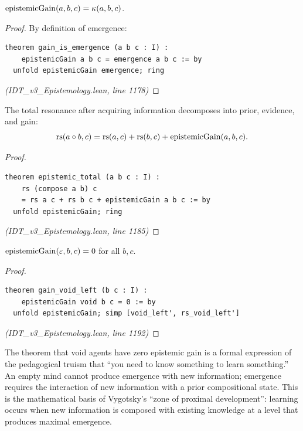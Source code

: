 \begin{theorem}
\label{thm:gain-is-emergence}
$\mathrm{epistemicGain}(a, b, c) = \kappa(a, b, c)$.
\end{theorem}

\begin{proof}
By definition of emergence:
\begin{lstlisting}
theorem gain_is_emergence (a b c : I) :
    epistemicGain a b c = emergence a b c := by
  unfold epistemicGain emergence; ring
\end{lstlisting}
\textit{(IDT\_v3\_Epistemology.lean, line 1178)}
\end{proof}

\begin{theorem}
\label{thm:epistemic-total}
The total resonance after acquiring information decomposes into prior, evidence,
and gain:
\[
  \mathrm{rs}(a \circ b, c) = \mathrm{rs}(a, c) + \mathrm{rs}(b, c) + \mathrm{epistemicGain}(a, b, c).
\]
\end{theorem}

\begin{proof}
\begin{lstlisting}
theorem epistemic_total (a b c : I) :
    rs (compose a b) c
    = rs a c + rs b c + epistemicGain a b c := by
  unfold epistemicGain; ring
\end{lstlisting}
\textit{(IDT\_v3\_Epistemology.lean, line 1185)}
\end{proof}

\begin{theorem}
\label{thm:gain-void}
$\mathrm{epistemicGain}(\varepsilon, b, c) = 0$ for all $b, c$.
\end{theorem}

\begin{proof}
\begin{lstlisting}
theorem gain_void_left (b c : I) :
    epistemicGain void b c = 0 := by
  unfold epistemicGain; simp [void_left', rs_void_left']
\end{lstlisting}
\textit{(IDT\_v3\_Epistemology.lean, line 1192)}
\end{proof}

\begin{interpretation}
The theorem that void agents have zero epistemic gain is a formal expression
of the pedagogical truism that ``you need to know something to learn something.''
An empty mind cannot produce emergence with new information; emergence requires
the interaction of new information with a prior compositional state. This is
the mathematical basis of Vygotsky's ``zone of proximal development'': learning
occurs when new information is composed with existing knowledge at a level that
produces maximal emergence.
\end{interpretation}

